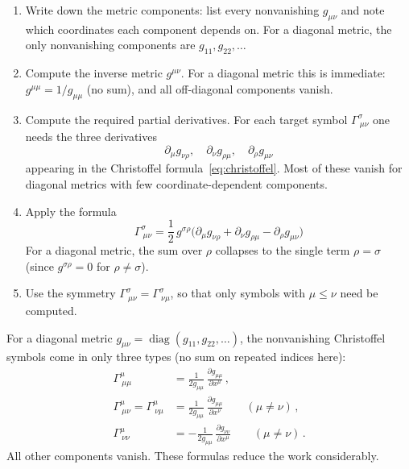 \begin{enumerate}
    \item Write down the metric components:
          list every nonvanishing $g_{\mu\nu}$ and note which coordinates
          each component depends on.  For a diagonal metric, the only
          nonvanishing components are $g_{11}, g_{22}, \ldots$

    \item Compute the inverse metric $g^{\mu\nu}$.
          For a diagonal metric this is immediate:
          $g^{\mu\mu} = 1/g_{\mu\mu}$ (no sum), and all off-diagonal
          components vanish.

    \item Compute the required partial derivatives.
          For each target symbol $\Gamma^\sigma_{\ \mu\nu}$ one needs
          the three derivatives
          \[
              \partial_\mu g_{\nu\rho}, \quad
              \partial_\nu g_{\rho\mu}, \quad
              \partial_\rho g_{\mu\nu}
          \]
          appearing in the Christoffel formula~\eqref{eq:christoffel}.
          Most of these vanish for diagonal metrics with few
          coordinate-dependent components.

    \item Apply the formula
          \[
              \Gamma^\sigma_{\ \mu\nu} = \frac{1}{2}\, g^{\sigma\rho}
              \bigl(\partial_\mu g_{\nu\rho} + \partial_\nu g_{\rho\mu}
              - \partial_\rho g_{\mu\nu}\bigr)
          \]
          For a diagonal metric, the sum over $\rho$ collapses to the
          single term $\rho = \sigma$ (since $g^{\sigma\rho} = 0$ for
          $\rho \neq \sigma$).

    \item Use the symmetry
          $\Gamma^\sigma_{\ \mu\nu} = \Gamma^\sigma_{\ \nu\mu}$, so that
          only symbols with $\mu \leq \nu$ need be computed.
\end{enumerate}

\begin{remark}
\label{rem:diagonal_shortcut}
For a diagonal metric $g_{\mu\nu} = \operatorname{diag}(g_{11}, g_{22}, \ldots)$,
the nonvanishing Christoffel symbols come in only three types
(no sum on repeated indices here):
\begin{align}
    \Gamma^\mu_{\ \mu\mu} &= \frac{1}{2g_{\mu\mu}}\,
        \frac{\partial g_{\mu\mu}}{\partial x^\mu} \,,
        \label{eq:diag_type1} \\[4pt]
    \Gamma^\mu_{\ \mu\nu} = \Gamma^\mu_{\ \nu\mu} &= \frac{1}{2g_{\mu\mu}}\,
        \frac{\partial g_{\mu\mu}}{\partial x^\nu}
        \qquad (\mu \neq \nu) \,,
        \label{eq:diag_type2} \\[4pt]
    \Gamma^\mu_{\ \nu\nu} &= -\frac{1}{2g_{\mu\mu}}\,
        \frac{\partial g_{\nu\nu}}{\partial x^\mu}
        \qquad (\mu \neq \nu) \,.
        \label{eq:diag_type3}
\end{align}
All other components vanish.  These formulas reduce the work considerably.
\end{remark}

